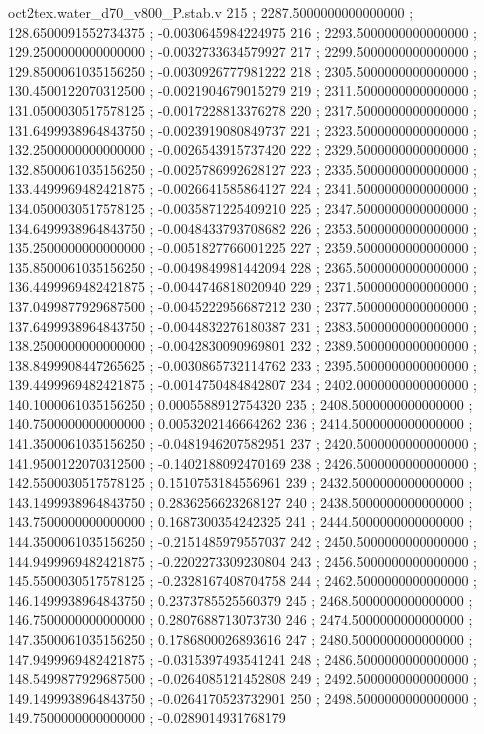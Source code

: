 \begin{filecontents}[overwrite]{oct2tex.water_d70_v800_P.stab.v}
215 ; 2287.5000000000000000 ; 128.6500091552734375 ; -0.0030645984224975
216 ; 2293.5000000000000000 ; 129.2500000000000000 ; -0.0032733634579927
217 ; 2299.5000000000000000 ; 129.8500061035156250 ; -0.0030926777981222
218 ; 2305.5000000000000000 ; 130.4500122070312500 ; -0.0021904679015279
219 ; 2311.5000000000000000 ; 131.0500030517578125 ; -0.0017228813376278
220 ; 2317.5000000000000000 ; 131.6499938964843750 ; -0.0023919080849737
221 ; 2323.5000000000000000 ; 132.2500000000000000 ; -0.0026543915737420
222 ; 2329.5000000000000000 ; 132.8500061035156250 ; -0.0025786992628127
223 ; 2335.5000000000000000 ; 133.4499969482421875 ; -0.0026641585864127
224 ; 2341.5000000000000000 ; 134.0500030517578125 ; -0.0035871225409210
225 ; 2347.5000000000000000 ; 134.6499938964843750 ; -0.0048433793708682
226 ; 2353.5000000000000000 ; 135.2500000000000000 ; -0.0051827766001225
227 ; 2359.5000000000000000 ; 135.8500061035156250 ; -0.0049849981442094
228 ; 2365.5000000000000000 ; 136.4499969482421875 ; -0.0044746818020940
229 ; 2371.5000000000000000 ; 137.0499877929687500 ; -0.0045222956687212
230 ; 2377.5000000000000000 ; 137.6499938964843750 ; -0.0044832276180387
231 ; 2383.5000000000000000 ; 138.2500000000000000 ; -0.0042830090969801
232 ; 2389.5000000000000000 ; 138.8499908447265625 ; -0.0030865732114762
233 ; 2395.5000000000000000 ; 139.4499969482421875 ; -0.0014750484842807
234 ; 2402.0000000000000000 ; 140.1000061035156250 ; 0.0005588912754320
235 ; 2408.5000000000000000 ; 140.7500000000000000 ; 0.0053202146664262
236 ; 2414.5000000000000000 ; 141.3500061035156250 ; -0.0481946207582951
237 ; 2420.5000000000000000 ; 141.9500122070312500 ; -0.1402188092470169
238 ; 2426.5000000000000000 ; 142.5500030517578125 ; 0.1510753184556961
239 ; 2432.5000000000000000 ; 143.1499938964843750 ; 0.2836256623268127
240 ; 2438.5000000000000000 ; 143.7500000000000000 ; 0.1687300354242325
241 ; 2444.5000000000000000 ; 144.3500061035156250 ; -0.2151485979557037
242 ; 2450.5000000000000000 ; 144.9499969482421875 ; -0.2202273309230804
243 ; 2456.5000000000000000 ; 145.5500030517578125 ; -0.2328167408704758
244 ; 2462.5000000000000000 ; 146.1499938964843750 ; 0.2373785525560379
245 ; 2468.5000000000000000 ; 146.7500000000000000 ; 0.2807688713073730
246 ; 2474.5000000000000000 ; 147.3500061035156250 ; 0.1786800026893616
247 ; 2480.5000000000000000 ; 147.9499969482421875 ; -0.0315397493541241
248 ; 2486.5000000000000000 ; 148.5499877929687500 ; -0.0264085121452808
249 ; 2492.5000000000000000 ; 149.1499938964843750 ; -0.0264170523732901
250 ; 2498.5000000000000000 ; 149.7500000000000000 ; -0.0289014931768179

\end{filecontents}
